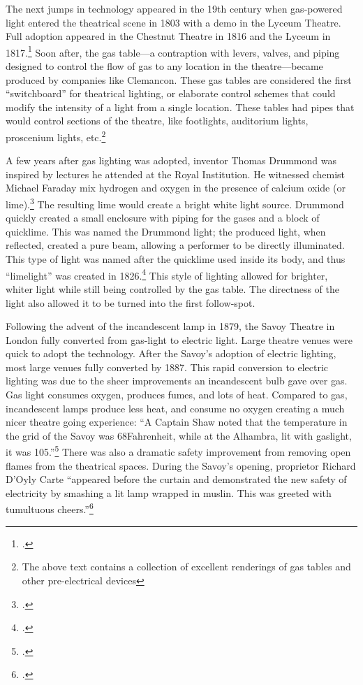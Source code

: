\documentclass[
    12pt,
    twoside,
    bibstyle=chicago,
    headerstyle=uppercase,
	bibfile=biblatex_updating.bib
]{reedthesis}
\begin{document}

The next jumps in technology appeared in the 19th century when gas-powered light entered the theatrical scene in 1803 with a demo in the Lyceum Theatre. Full adoption appeared in the Chestnut Theatre in 1816 and the Lyceum in 1817.\footcite[p. 174]{pilbrowStageLightingDesign1997}  Soon after, the gas table---a contraption with levers, valves, and piping designed to control the flow of gas to any location in the theatre---became produced by companies like Clemancon. These gas tables are considered the first “switchboard” for theatrical lighting, or elaborate control schemes that could modify the intensity of a light from a single location. These tables had pipes that would control sections of the theatre, like footlights, auditorium lights, proscenium lights, etc.\footnote{The above text contains a collection of excellent renderings of gas tables and other pre-electrical devices}

A few years after gas lighting was adopted, inventor Thomas Drummond was inspired by lectures he attended at the Royal Institution. He witnessed chemist Michael Faraday mix hydrogen and oxygen in the presence of calcium oxide (or lime).\footcite[p. 157]{craigm.carverHistoryEnglishIts1991} The resulting lime would create a bright white light source. Drummond quickly created a small enclosure with piping for the gases and a block of quicklime. This was named the Drummond light; the produced light, when reflected, created a pure beam, allowing a performer to be directly illuminated. This type of light was named after the quicklime used inside its body, and thus “limelight” was created in 1826.\footcite[p. 174]{pilbrowStageLightingDesign1997} This style of lighting allowed for brighter, whiter light while still being controlled by the gas table. The directness of the light also allowed it to be turned into the first follow-spot.

Following the advent of the incandescent lamp in 1879, the Savoy Theatre in London fully converted from gas-light to electric light. Large theatre venues were quick to adopt the technology. After the Savoy's adoption of electric lighting, most large venues fully converted by 1887. This rapid conversion to electric lighting was due to the sheer improvements an incandescent bulb gave over gas. Gas light consumes oxygen, produces fumes, and lots of heat. Compared to gas, incandescent lamps produce less heat, and consume no oxygen creating a much nicer theatre going experience: “A Captain Shaw noted that the temperature in the grid of the Savoy was 68\degree Fahrenheit, while at the Alhambra, lit with gaslight, it was 105\degree.”\footcite[p. 176]{pilbrowStageLightingDesign1997} There was also a dramatic safety improvement from removing open flames from the theatrical spaces. During the Savoy's opening, proprietor Richard D'Oyly Carte “appeared before the curtain and demonstrated the new safety of electricity by smashing a lit lamp wrapped in muslin. This was greeted with tumultuous cheers.”\footcite[p. 175]{pilbrowStageLightingDesign1997}
\end{document}
